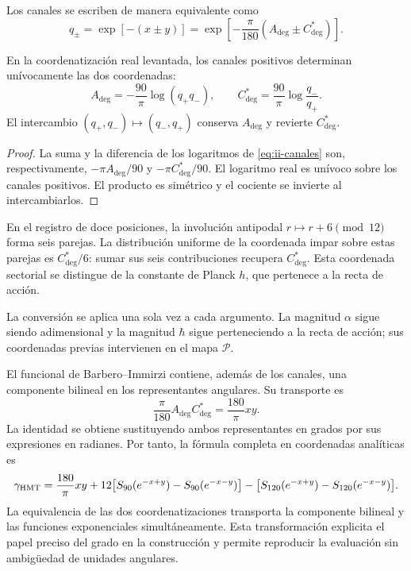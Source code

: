 Los canales se escriben de manera equivalente como
\begin{equation}
 q_\pm=\exp[-(x\pm y)]
 =\exp\!\left[-\frac{\pi}{180}(A_{\deg}\pm C^*_{\deg})\right].
\label{eq:ii-canales}
\end{equation}
\begin{proposition}
\label{prop:ii-inversion-canales-angulares}
En la coordenatización real levantada, los canales positivos determinan
unívocamente las dos coordenadas:
\[
 A_{\deg}=-\frac{90}{\pi}\log(q_+q_-),\qquad
 C^*_{\deg}=\frac{90}{\pi}\log\frac{q_-}{q_+}.
\]
El intercambio \((q_+,q_-)\mapsto(q_-,q_+)\) conserva
\(A_{\deg}\) y revierte \(C^*_{\deg}\).
\end{proposition}
\begin{proof}
La suma y la diferencia de los logaritmos de
\eqref{eq:ii-canales} son, respectivamente,
\(-\pi A_{\deg}/90\) y \(-\pi C^*_{\deg}/90\).
El logaritmo real es unívoco sobre los canales positivos.
El producto es simétrico y el cociente se invierte al intercambiarlos.
\end{proof}
En el registro de doce posiciones, la involución antipodal
\(r\mapsto r+6\pmod {12}\) forma seis parejas. La distribución
uniforme de la coordenada impar sobre estas parejas es
\(C^*_{\deg}/6\): sumar sus seis contribuciones recupera
\(C^*_{\deg}\). Esta coordenada sectorial se distingue de
la constante de Planck \(h\), que pertenece a la recta de acción.

La conversión se aplica una sola vez a cada argumento. La magnitud
\(\alpha\) sigue siendo adimensional y la magnitud \(\hbar\)
sigue perteneciendo a la recta de acción; sus coordenadas previas
intervienen en el mapa \(\mathcal P\).

El funcional de Barbero--Immirzi contiene, además de los canales, una
componente bilineal en los representantes angulares. Su transporte es
\begin{equation}
 \frac{\pi}{180}A_{\deg}C^*_{\deg}
 =\frac{180}{\pi}xy.
 \label{eq:ii-barbero-cartas}
\end{equation}
La identidad se obtiene sustituyendo ambos representantes en grados
por sus expresiones en radianes. Por tanto, la fórmula completa en
coordenadas analíticas es
\[
 \gamma_{\mathrm{HMT}}
 =\frac{180}{\pi}xy
 +12\bigl[S_{90}(e^{-x+y})-S_{90}(e^{-x-y})\bigr]
 -\bigl[S_{120}(e^{-x+y})-S_{120}(e^{-x-y})\bigr].
\]
La equivalencia de las dos coordenatizaciones transporta la componente bilineal
y las funciones exponenciales simultáneamente. Esta transformación
explicita el papel preciso del grado en la construcción y permite
reproducir la evaluación sin ambigüedad de unidades angulares.
\par\endgroup
